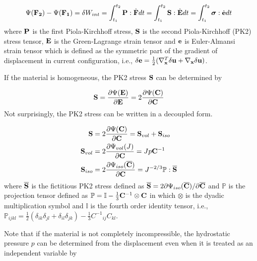 \begin{equation}
\Psi({\bold{F_2}}) - \Psi({\bold{F_1}}) = \delta{W_{int}} = \int_{t_1}^{t_2}\bold{P}:\dot{\bold{F}}dt = \int_{t_1}^{t_2}\bold{S}:\dot{\bold{E}}dt = 
\int_{t_1}^{t_2}\boldsymbol{\sigma}:\dot{\bold{e}}dt
\end{equation}
where $\bold{P}$ is the first Piola-Kirchhoff stress, $\bold{S}$ is the second Piola-Kirchhoff (PK2) stress tensor, $\bold{E}$ is the Green-Lagrange strain tensor and $\bold{e}$ is Euler-Almansi strain tensor which is defined as the symmetric part of the gradient of displacement in current configuration, i.e., $\delta\bold{e} = \frac{1}{2}( \nabla_{\bold{x}}^T\delta\bold{u} + \nabla_{\bold{x}}\delta\bold{u} )$.

If the material is homogeneous, the PK2 stress $\bold{S}$ can be determined by 

\begin{equation}
\bold{S}  = \frac{\partial\Psi(\bold{E})}{\partial{\bold{E}}} = 2\frac{\partial\Psi(\bold{C})}{\partial{\bold{C}}}\end{equation}
Not surprisingly, the PK2 stress can be written in a decoupled form.

\begin{subequations}
\label{S}
\begin{align}
\bold{S} &=  2\frac{\partial{\Psi({\bold{C})}}}{\partial{\bold{C}}} = \bold{S}_{vol}  + \bold{S}_{iso} 
\label {Stotal} \\
\bold{S}_{vol} &= 2\frac{\partial{\Psi_{vol}(J)}}{\partial{\bold{C}}} = Jp{\bold{C}} ^{-1} \label{Svol} \\
\bold{S}_{iso}  &= 2\frac{\partial{\Psi_{iso}({\overline{\bold{C}})}}}{\partial{\bold{C}}} = J^{-2/3}\mathbb{P}:\overline{\bold{S}}
\label{Siso}
\end{align}
\end{subequations}
where  $\overline{\bold{S}}$ is the fictitious PK2 stress defined as
$\overline{\bold{S}} = 2{\partial\Psi_{iso}({\overline{\bold{C}})}} / {\partial\overline{\bold{C}}}$
and $\mathbb{P}$ is the projection tensor defined as $\mathbb{P} = \mathbb{I} - \frac{1}{3}\bold{C}^{-1} \otimes \bold{C} $ in which $\otimes$ is the dyadic multiplication symbol and $\mathbb{I}$ is the fourth order identity tensor, i.e.,  $\mathbb{P}_{ijkl} =  \frac{1}{2}(\delta_{ik}\delta_{jl} + \delta_{il}\delta_{jk}) - \frac{1}{3} {{C}^{-1}}_{ij} {C}_{kl}$.

Note that if the material is not completely incompressible, the hydrostatic pressure $p$ can be determined from the displacement even when it is treated as an independent variable by

